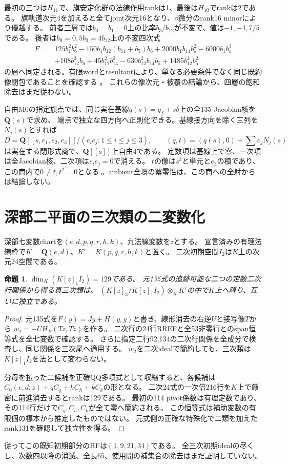 \documentclass[11pt,a4paper]{ltjsarticle}
\newcommand{\QQ}{\mathbf Q}
\newtheorem{proposition}[theorem]{命題}
\theoremstyle{remark}
\begin{document}
最初の三つは$H_{11}$で、旗安定化群の法線作用rankは1、最後は$H_{10}$でrankは2である。
旗軌道次元4を加えると全てjoint次元16となり、$\beta$微分のrank16 minorにより優越する。
前者三層では$b_0=b_1=0$上の比率$b_3/b_{12}$が不変で、値は$-1,-4,7/5$である。
後者は$b_0=0,5b_3=4b_{12}$上の不変四次式
\begin{align*}
 F={}&125b_1^2b_6^2-150b_1b_{12}(b_{14}+b_5)b_6
       +2000b_1b_{14}b_5^2-6000b_1b_5^3\\
 &+108b_{12}^3b_6+45b_{12}^2b_{14}^2
       -630b_{12}^2b_{14}b_5+1485b_{12}^2b_5^2
\end{align*}
の層へ同定される。有限wordとresultantにより、単なる必要条件でなく同じ既約像閉包であることを確認する
\cite{flag-table-v46,flag-invariants-v46}。
これらの像次元・被覆の結論から、四層の飽和除去はまだ従わない。

自由M0の指定旗点では、同じ実在基線$q(s)=q_f+s\delta$上の全135 Jacobian核を$\QQ(s)$で求め、
端点で独立な四方向へ正則化できる。基線接方向を除く三列を$N_j(s)$とすれば
\[
 D=\QQ[[s,e_1,e_2,e_3]]/(e_i e_j:1\le i\le j\le3),\qquad
 (q,t)=(q(s),0)+\sum e_jN_j(s)
\]
は実在する閉形式商で、$\QQ[[s]]$上自由4である。
定数項は基線上で零、一次項は全Jacobian核、二次項は$e_i e_j=0$で消える。
$t$の像は$s^3$と単元と$e_3$の積であり、この商内で$0\ne t,t^2=0$となる
\cite{free-flat4-v46}。ambient全環の冪零性は、この商への全射からは結論しない。

\section{深部二平面の三次類の二変数化}
深部七変数chartを$(e,d,p,q,r,h,k)$、九法線変数を$z$とする。
宣言済みの有理法線枠で$K=\QQ(e,d)$、$K'=K(p,q,r,h,k)$と置く。
二次初期空間$I_2$は$K$上の次元24空間である。

\begin{proposition}
$\dim_K(K[z]_1I_2)=129$である。
元135式の追跡可能な二つの定数二次行関係から得る真三次類は、
$(K[z]_3/K[z]_1I_2)\otimes_KK'$の中で$K$上へ降り、互いに独立である。
\end{proposition}
\begin{proof}
元135式を$F(y)=Jy+H(y,y)$と書き、線形消去の右逆$U$と接写像$T$から
$w_2=-UH_E(Tz,Tz)$を作る。
二次行の24行RREFと全53非零行とのspan恒等式を全七変数で確認する。
さらに指定二行92,134の二次行関係を全成分で検査し、同じ関係を三次尾へ適用する。
$w_2$を二次idealで簡約しても、三次類は$K[z]_1I_2$を法として変わらない。

分母を払った二候補を正確QQ多項式として収縮すると、各候補は
$C_0(e,d;z)+qC_q+hC_h+kC_k$の形となる。
二次24式の一次倍216行を$K$上で厳密に前進消去するとrankは129である。
最初の114 pivot係数は有理定数であり、その114行だけで$C_q,C_h,C_k$が全て零へ簡約される。
この恒等式は補助変数の有限個の標本から推定したものではない。
元式側の正確な特殊化で二類を加えたrank131を確認して独立性を得る\cite{deep-cubic-v46}。
\end{proof}
従ってこの既知初期部分のHFは$(1,9,21,34)$である。
全三次初期idealの尽くし、次数四以降の消滅、全長65、使用開の補集合の除去はまだ証明していない。
\end{document}
